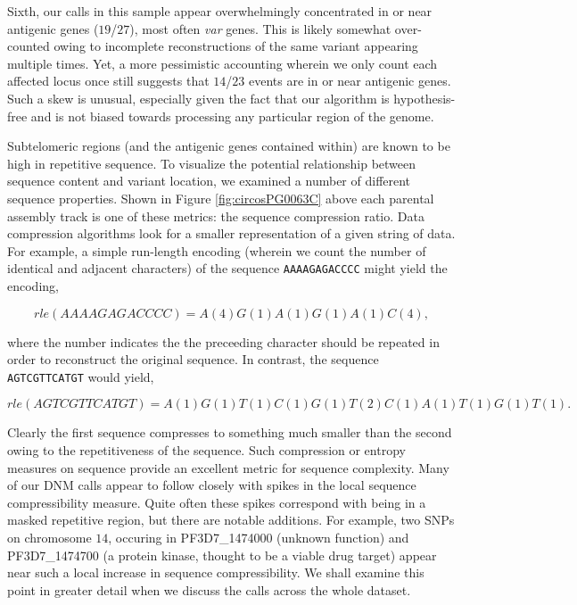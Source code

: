 Sixth, our calls in this sample appear overwhelmingly concentrated in or near antigenic genes ($19$/$27$), most often \textit{var} genes.  This is likely somewhat over-counted owing to incomplete reconstructions of the same variant appearing multiple times.  Yet, a more pessimistic accounting wherein we only count each affected locus once still suggests that $14$/$23$ events are in or near antigenic genes.  Such a skew is unusual, especially given the fact that our algorithm is hypothesis-free and is not biased towards processing any particular region of the genome.

Subtelomeric regions (and the antigenic genes contained within) are known to be high in repetitive sequence.  To visualize the potential relationship between sequence content and variant location, we examined a number of different sequence properties.  Shown in Figure \ref{fig:circosPG0063C} above each parental assembly track is one of these metrics: the sequence compression ratio.  Data compression algorithms look for a smaller representation of a given string of data.  For example, a simple run-length encoding (wherein we count the number of identical and adjacent characters) of the sequence \texttt{AAAAGAGACCCC} might yield the encoding,

\begin{equation}
rle(AAAAGAGACCCC) = A(4)G(1)A(1)G(1)A(1)C(4) ,
\end{equation}

\noindent where the number indicates the the preceeding character should be repeated in order to reconstruct the original sequence.  In contrast, the sequence \texttt{AGTCGTTCATGT} would yield,

\begin{equation}
rle(AGTCGTTCATGT) = A(1)G(1)T(1)C(1)G(1)T(2)C(1)A(1)T(1)G(1)T(1) .
\end{equation}

\noindent Clearly the first sequence compresses to something much smaller than the second owing to the repetitiveness of the sequence.  Such compression or entropy measures on sequence provide an excellent metric for sequence complexity.  Many of our DNM calls appear to follow closely with spikes in the local sequence compressibility measure.  Quite often these spikes correspond with being in a masked repetitive region, but there are notable additions.  For example, two SNPs on chromosome $14$, occuring in PF3D7\_1474000 (unknown function) and PF3D7\_1474700 (a protein kinase, thought to be a viable drug target\cite{Talevich:2011ei}) appear near such a local increase in sequence compressibility.  We shall examine this point in greater detail when we discuss the calls across the whole dataset.

